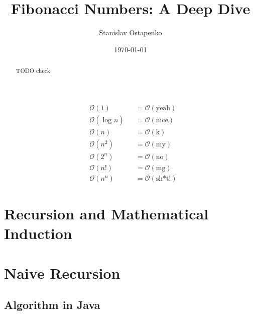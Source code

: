 \documentclass{article}
\begin{document}


\title{Fibonacci Numbers: A Deep Dive}
\author{Stanislav Ostapenko}
\date{\today}
\maketitle

\begin{abstract}
	TODO check
\end{abstract}

\clearpage

	\tableofcontents %

	\clearpage
	
	\lstlistoflistings %

\clearpage %

\clearpage

	\thispagestyle{empty}

	\vspace*{\fill}
	\begin{center}
		\Huge
		\begin{align*}
			&   \mathcal{O}(1) &&= \mathcal{O}(\text{yeah})\\
			&    \mathcal{O}(\log_{} n) &&= \mathcal{O}(\text{nice})\\
			&    \mathcal{O}(n) &&= \mathcal{O}(\text{k})\\
			&    \mathcal{O}(n^{2}) &&= \mathcal{O}(\text{my})\\
			&    \mathcal{O}(2^{n}) &&= \mathcal{O}(\text{no})\\
			&    \mathcal{O}(n!) &&= \mathcal{O}(\text{mg})\\
			&    \mathcal{O}(n^{n}) &&= \mathcal{O}(\text{sh*t!})
		\end{align*}
	\end{center}
	\vspace*{\fill}

\clearpage

\section{Recursion and Mathematical Induction}
\section{Naive Recursion}
\subsection{Algorithm in Java}
\end{document}
